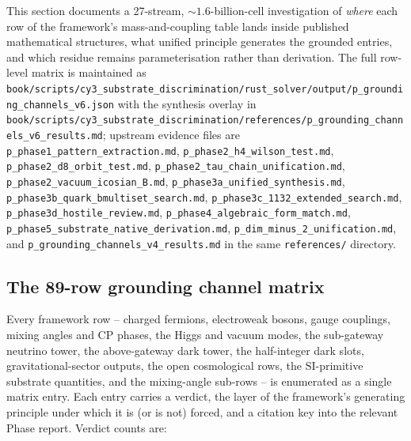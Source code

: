 ﻿\documentclass[reprint,amsmath,amssymb,aps,prd,longbibliography,floatfix]{revtex4-2}
\begin{document}
This section documents a 27-stream, $\sim 1.6$-billion-cell investigation
of \emph{where} each row of the framework's mass-and-coupling table
lands inside published mathematical structures, what unified principle
generates the grounded entries, and which residue remains
parameterisation rather than derivation. The full row-level matrix is
maintained as
\texttt{book/scripts/cy3\_substrate\_discrimination/rust\_solver/output/p\_grounding\_channels\_v6.json}
with the synthesis overlay in
\texttt{book/scripts/cy3\_substrate\_discrimination/references/p\_grounding\_channels\_v6\_results.md};
upstream evidence files are
\texttt{p\_phase1\_pattern\_extraction.md},
\texttt{p\_phase2\_h4\_wilson\_test.md},
\texttt{p\_phase2\_d8\_orbit\_test.md},
\texttt{p\_phase2\_tau\_chain\_unification.md},
\texttt{p\_phase2\_vacuum\_icosian\_B.md},
\texttt{p\_phase3a\_unified\_synthesis.md},
\texttt{p\_phase3b\_quark\_bmultiset\_search.md},
\texttt{p\_phase3c\_1132\_extended\_search.md},
\texttt{p\_phase3d\_hostile\_review.md},
\texttt{p\_phase4\_algebraic\_form\_match.md},
\texttt{p\_phase5\_substrate\_native\_derivation.md},
\texttt{p\_dim\_minus\_2\_unification.md}, and
\texttt{p\_grounding\_channels\_v4\_results.md} in the same
\texttt{references/} directory.

\subsection{The 89-row grounding channel matrix}
\label{sec:grounding-74row}

Every framework row -- charged fermions, electroweak bosons, gauge
couplings, mixing angles and CP phases, the Higgs and vacuum modes, the
sub-gateway neutrino tower, the above-gateway dark tower, the
half-integer dark slots, gravitational-sector outputs, the open
cosmological rows, the SI-primitive substrate quantities, and the
mixing-angle sub-rows -- is enumerated as a single matrix entry. Each
entry carries a verdict, the layer of the framework's generating
principle under which it is (or is not) forced, and a citation key into
the relevant Phase report. Verdict counts are:
\end{document}
